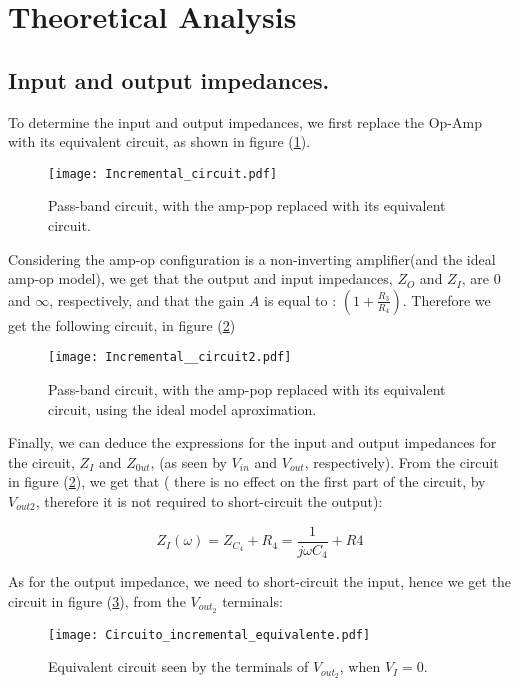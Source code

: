 \section{Theoretical Analysis}
\label{sec:analysis}

\subsection{Input and output impedances.}
To determine the input and output impedances, we first replace the Op-Amp with its equivalent circuit, as shown in figure (\ref{fig:eq_circuit}). 

\begin{figure}[H] \centering
\texttt{[image: Incremental\_circuit.pdf]}
\caption{Pass-band circuit, with the amp-pop replaced with its equivalent circuit.}
\label{fig:eq_circuit}
\end{figure}

Considering the amp-op configuration is a non-inverting amplifier(and the ideal amp-op model), we get that the output and input impedances, $Z_O$ and $Z_I$,  are $0$ and $\infty$, respectively, and that the gain $A$ is equal to : $(1+\frac{R_3}{R_4})$. Therefore we get the following circuit, in figure (\ref{fig:eq_circuit2})

\begin{figure}[H] \centering
\texttt{[image: Incremental\_\_circuit2.pdf]}
\caption{Pass-band circuit, with the amp-pop replaced with its equivalent circuit, using the ideal model aproximation.}
\label{fig:eq_circuit2}
\end{figure}


Finally, we can deduce the expressions for the input and output impedances for the circuit, $Z_I$ and $Z_{0ut}$, (as seen by $V_{in}$ and $V_{out}$, respectively).
From the circuit in figure (\ref{fig:eq_circuit2}), we get that ( there is no effect on the first part of the circuit, by $V_{out2}$, therefore it is not required to short-circuit the output):

\begin{equation}
Z_I(\omega) = Z_{C_4} + R_4 = \frac{1}{j\omega C_4 } + R4   
\end{equation}

As for the output impedance, we need to short-circuit the input, hence we get the circuit in figure (\ref{fig:eq_circuit3}), from the $V_{out_2}$ terminals:

\begin{figure}[H] \centering
\texttt{[image: Circuito\_incremental\_equivalente.pdf]}
\caption{Equivalent circuit seen by the terminals of $V_{out_2}$, when $V_I = 0$.}
\label{fig:eq_circuit3}

\end{figure}





